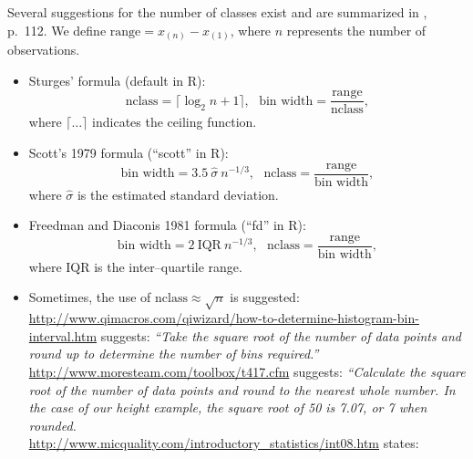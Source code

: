 \documentclass[12pt,letterpaper,final]{article}
\begin{document}
Several suggestions for the number of classes exist and are 
summarized in \cite{VR2002}, p.~112. We define $\mbox{range} = x_{(n)} - x_{(1)}$, 
where $n$ represents the number of observations.
\begin{itemize}
\item Sturges' formula (default in R): 
\[
\mbox{nclass} = \lceil \log_2 n + 1 \rceil, ~~~ \mbox{bin width} = \frac{\mbox{range}}{\mbox{nclass}},
\]
where $\lceil \ldots \rceil$ indicates the ceiling function.

\item Scott's 1979 formula (``scott'' in R):
\[
\mbox{bin width} = 3.5 ~ \hat{\sigma} ~ n^{-1/3}, ~~~ \mbox{nclass} = \frac{\mbox{range}}{\mbox{bin width}},
\]
where $\hat{\sigma}$ is the estimated standard deviation.

\item Freedman and Diaconis 1981 formula (``fd'' in R): 
\[
\mbox{bin width} = 2 ~ \mbox{IQR} ~ n^{-1/3}, ~~~ \mbox{nclass} = \frac{\mbox{range}}{\mbox{bin width}},
\]
where $\mbox{IQR}$ is the inter--quartile range.

\item Sometimes, the use of $\mbox{nclass} \approx \sqrt{n}$ is suggested: \\[0.2cm]
%
\url{http://www.qimacros.com/qiwizard/how-to-determine-histogram-bin-interval.htm}
suggests: {\it ``Take the square root of the number of data points and round up to 
determine the number of bins required.''} \\[0.2cm]
%
\url{http://www.moresteam.com/toolbox/t417.cfm} suggests:
{\it ``Calculate the square root of the number of data points and round to the 
nearest whole number. In the case of our height example, 
the square root of 50 is 7.07, or 7 when rounded.} \\[0.2cm]
%
\url{http://www.micquality.com/introductory_statistics/int08.htm} states: 

\end{itemize}
\end{document}
